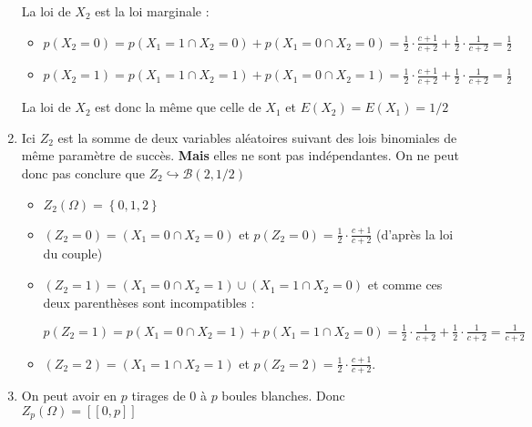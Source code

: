 \begin{correction}
\begin{enumerate}
La loi de $X_{2}$ est la loi marginale :

\begin{itemize}
\item $p\left( X_{2}=0\right) =p\left( X_{1}=1\cap X_{2}=0\right) +p\left(
X_{1}=0\cap X_{2}=0\right) =\displaystyle
\frac{1}{2}\cdot \frac{c+1}{c+2}+\frac{1}{2}\cdot \frac{1}{c+2}=\frac{1}{2}$

\item $p\left( X_{2}=1\right) =p\left( X_{1}=1\cap X_{2}=1\right) +p\left(
X_{1}=0\cap X_{2}=1\right) =\displaystyle
\frac{1}{2}\cdot \frac{c+1}{c+2}+\frac{1}{2}\cdot \frac{1}{c+2}=\frac{1}{2}$
\end{itemize}

La loi de $X_{2}$ est donc la m\^{e}me que celle de $X_{1}$ et $E\left(
X_{2}\right) =E\left( X_{1}\right) =1/2$

\item Ici $Z_{2}$ est la somme de deux variables al\'{e}atoires suivant des
lois binomiales de m\^{e}me param\`{e}tre de succ\`{e}s. \textbf{Mais }elles
ne sont pas ind\'{e}pendantes. On ne peut donc pas conclure que $%
Z_{2}\hookrightarrow \mathcal{B}\left( 2,1/2\right) $

\begin{itemize}
\item $Z_{2}\left( \Omega \right) =\left\{ 0,1,2\right\} $

\item $\left( Z_{2}=0\right) =\left( X_{1}=0\cap X_{2}=0\right) $ et $%
p\left( Z_{2}=0\right) =\displaystyle
\frac{1}{2}\cdot \frac{c+1}{c+2}$ (d'apr\`{e}s la loi du couple)

\item $\left( Z_{2}=1\right) =\left( X_{1}=0\cap X_{2}=1\right) \cup \left(
X_{1}=1\cap X_{2}=0\right) $ et comme ces deux parenth\`{e}ses sont
incompatibles :

$p\left( Z_{2}=1\right) =p\left( X_{1}=0\cap X_{2}=1\right) +p\left(
X_{1}=1\cap X_{2}=0\right) =\displaystyle
\frac{1}{2}\cdot \frac{1}{c+2}+\frac{1}{2}\cdot \frac{1}{c+2}=\frac{1}{c+2}$

\item $\left( Z_{2}=2\right) =\left( X_{1}=1\cap X_{2}=1\right) $ et $%
p\left( Z_{2}=2\right) =\displaystyle
\frac{1}{2}\cdot \frac{c+1}{c+2}$.
\end{itemize}

\item On peut avoir en $p$ tirages de 0 \`{a} $p$ boules blanches. Donc $%
Z_{p}\left( \Omega \right) =\left[ \left[ 0,p\right] \right] $


\end{enumerate}
\end{correction}
